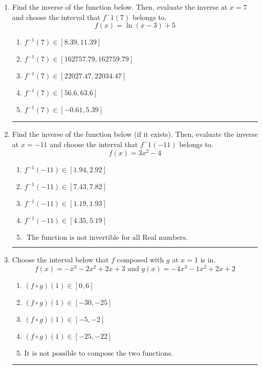 \documentclass[14pt]{extbook}
\newcommand{\litem}[1]{\item#1\hspace*{-1cm}\rule{\textwidth}{0.4pt}}
\begin{document}
\begin{enumerate}
{\begin{enumerate}[label=\Alph*.]
\end{enumerate} }
\litem{
Find the inverse of the function below. Then, evaluate the inverse at $x = 7$ and choose the interval that $f^-1(7)$ belongs to.\[ f(x) = \ln{(x-3)}+5 \]\begin{enumerate}[label=\Alph*.]
\item \( f^{-1}(7) \in [8.39, 11.39] \)
\item \( f^{-1}(7) \in [162757.79, 162759.79] \)
\item \( f^{-1}(7) \in [22027.47, 22034.47] \)
\item \( f^{-1}(7) \in [56.6, 63.6] \)
\item \( f^{-1}(7) \in [-0.61, 5.39] \)

\end{enumerate} }
\litem{
Find the inverse of the function below (if it exists). Then, evaluate the inverse at $x = -11$ and choose the interval that $f^-1(-11)$ belongs to.\[ f(x) = 3 x^2 - 4 \]\begin{enumerate}[label=\Alph*.]
\item \( f^{-1}(-11) \in [1.94, 2.92] \)
\item \( f^{-1}(-11) \in [7.43, 7.82] \)
\item \( f^{-1}(-11) \in [1.19, 1.93] \)
\item \( f^{-1}(-11) \in [4.35, 5.19] \)
\item \( \text{ The function is not invertible for all Real numbers. } \)

\end{enumerate} }
\litem{
Choose the interval below that $f$ composed with $g$ at $x=1$ is in.\[ f(x) = -x^{3} -2 x^{2} +2 x + 3 \text{ and } g(x) = -4x^{3} -1 x^{2} +2 x + 2 \]\begin{enumerate}[label=\Alph*.]
\item \( (f \circ g)(1) \in [0, 6] \)
\item \( (f \circ g)(1) \in [-30, -25] \)
\item \( (f \circ g)(1) \in [-5, -2] \)
\item \( (f \circ g)(1) \in [-25, -22] \)
\item \( \text{It is not possible to compose the two functions.} \)


\end{enumerate}}
\end{enumerate}
\end{document}

